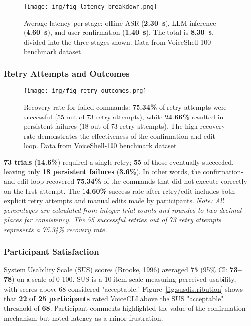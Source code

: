 \documentclass[a4paper,12pt]{article}
\begin{document}
\begin{figure}[htbp]
  \centering
  \texttt{[image: img/fig\_latency\_breakdown.png]}
  \caption{Average latency per stage: offline ASR (\textbf{2.30~s}), LLM inference (\textbf{4.60~s}), and user confirmation (\textbf{1.40~s}). The total is \textbf{8.30~s}, divided into the three stages shown. Data from VoiceShell-100 benchmark dataset~\cite{ref26,ref27}.}
  \label{fig:latencybreakdown}
\end{figure}

\subsubsection{Retry Attempts and Outcomes}

\begin{figure}[htbp]
  \centering
  \texttt{[image: img/fig\_retry\_outcomes.png]}
  \caption{Recovery rate for failed commands: \textbf{75.34\%} of retry attempts were successful (55 out of 73 retry attempts), while \textbf{24.66\%} resulted in persistent failures (18 out of 73 retry attempts). The high recovery rate demonstrates the effectiveness of the confirmation-and-edit loop. Data from VoiceShell-100 benchmark dataset~\cite{ref26,ref27}.}
  \label{fig:retryoutcomes}
\end{figure}

\noindent \textbf{73 trials} (\textbf{14.6\%}) required a single retry; \textbf{55} of those eventually succeeded, leaving only \textbf{18 persistent failures} (\textbf{3.6\%}). In other words, the confirmation-and-edit loop recovered \textbf{75.34\%} of the commands that did not execute correctly on the first attempt. The \textbf{14.60\%} success rate after retry/edit includes both explicit retry attempts and manual edits made by participants. \textit{Note: All percentages are calculated from integer trial counts and rounded to two decimal places for consistency. The 55 successful retries out of 73 retry attempts represents a 75.34\% recovery rate.}

\subsubsection{Participant Satisfaction}

\noindent System Usability Scale (SUS) scores (Brooke, 1996) averaged \textbf{75} (95\% CI: \textbf{73–78}) on a scale of 0-100. SUS is a 10-item scale measuring perceived usability, with scores above 68 considered "acceptable." Figure~\ref{fig:susdistribution} shows that \textbf{22 of 25 participants} rated VoiceCLI above the SUS "acceptable" threshold of \textbf{68}. Participant comments highlighted the value of the confirmation mechanism but noted latency as a minor frustration.
\end{document}
